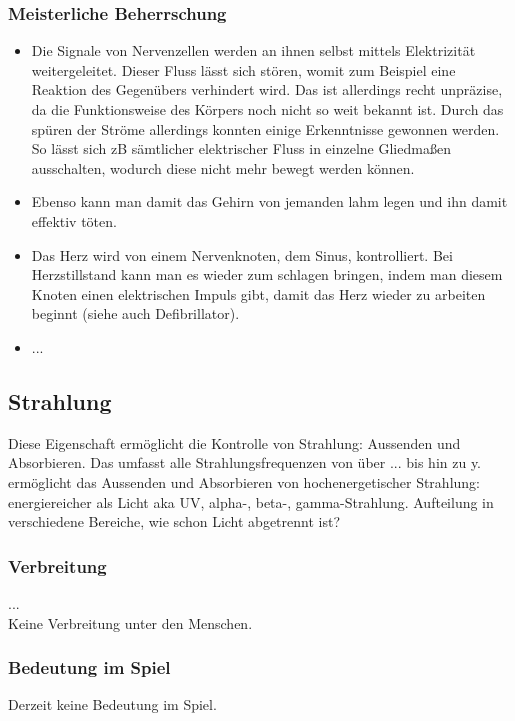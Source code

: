 \subsubsection{Meisterliche Beherrschung} 
\begin{itemize}
	\item Die Signale von Nervenzellen werden an ihnen selbst mittels Elektrizität weitergeleitet. Dieser Fluss lässt sich stören, womit zum Beispiel eine Reaktion des Gegenübers verhindert wird. Das ist allerdings recht unpräzise, da die Funktionsweise des Körpers noch nicht so weit bekannt ist. Durch das spüren der Ströme allerdings konnten einige Erkenntnisse gewonnen werden. So lässt sich zB sämtlicher elektrischer Fluss in einzelne Gliedmaßen ausschalten, wodurch diese nicht mehr bewegt werden können.
	\item Ebenso kann man damit das Gehirn von jemanden lahm legen und ihn damit effektiv töten.
	\item Das Herz wird von einem Nervenknoten, dem Sinus, kontrolliert. Bei Herzstillstand kann man es wieder zum schlagen bringen, indem man diesem Knoten einen elektrischen Impuls gibt, damit das Herz wieder zu arbeiten beginnt (siehe auch Defibrillator).
	\item ...
\end{itemize}



\subsection{Strahlung}\label{sec:strahlungsmagie}
Diese Eigenschaft ermöglicht die Kontrolle von Strahlung: Aussenden und Absorbieren. Das umfasst alle Strahlungsfrequenzen von  über ... bis hin zu y.
 ermöglicht das Aussenden und Absorbieren von hochenergetischer Strahlung: energiereicher als Licht aka UV, alpha-, beta-, gamma-Strahlung. Aufteilung in verschiedene Bereiche, wie schon Licht abgetrennt ist? 

\subsubsection{Verbreitung}
...\\
Keine Verbreitung unter den Menschen.

\subsubsection{Bedeutung im Spiel}
Derzeit keine Bedeutung im Spiel.


